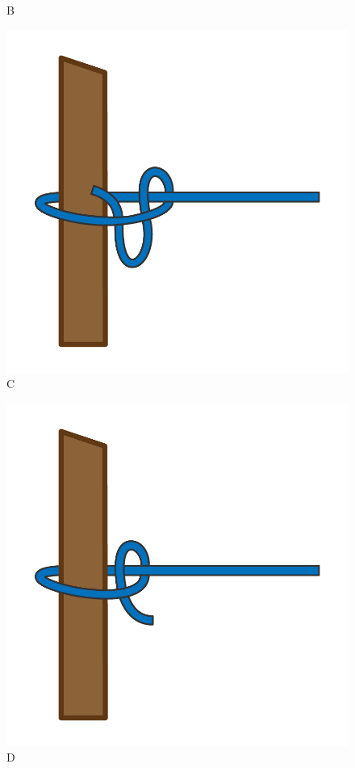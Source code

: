 \begin{figure}[H]
\begin{minipage}[b]{0.23\textwidth}
		\centering
		B
	\end{minipage}
	\hfill
	\begin{minipage}[b]{0.23\textwidth}
		\includegraphics[width=\textwidth]{Hoofdstukken/Schiemannen/pdf/slip_steek.pdf}
		\centering
		C
	\end{minipage}
	\hfill
	\begin{minipage}[b]{0.23\textwidth}
		\includegraphics[width=\textwidth]{Hoofdstukken/Schiemannen/pdf/halve_steek.pdf}
		\centering
		D
	\end{minipage}
\end{figure}


\vspace{0.5cm}

